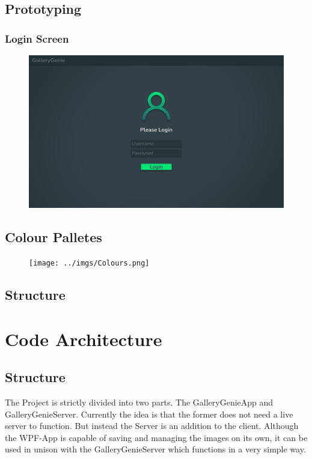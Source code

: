 \documentclass[a4paper,12pt]{article}
\newcommand{\imgal}{GalleryGenie}
\newcommand{\imgalapp}{\color{client}\imgal App\color{black}}
\newcommand{\imgalserver}{\color{server}\imgal Server\color{black}}
\begin{document}
\subsection{Prototyping}
\subsubsection{Login Screen}

\begin{figure}[!h]
	\includegraphics[width=\linewidth]{../imgs/Login.png}
\end{figure}

\newpage
\subsection{Colour Palletes}
\begin{figure}[!h]
	\texttt{[image: ../imgs/Colours.png]}
\end{figure}

\newpage
\subsection{Structure}


\section{Code Architecture}
\subsection{Structure}
The Project is strictly divided into two parts. The \imgalapp{}  and \imgalserver{}. Currently the idea is that the former does not need a live server to function. But instead the Server is an addition to the client. Although the WPF-App is capable of saving and managing the images on its own, it can be used in unison with the \imgalserver{} which functions in a very simple way.
\end{document}
